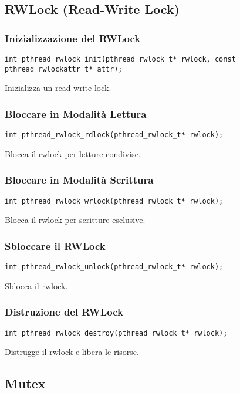 \documentclass[a4paper,12pt]{article}
\begin{document}
\subsection{RWLock (Read-Write Lock)}

\subsubsection{Inizializzazione del RWLock}
\begin{lstlisting}
int pthread_rwlock_init(pthread_rwlock_t* rwlock, const pthread_rwlockattr_t* attr);
\end{lstlisting}
Inizializza un read-write lock.

\subsubsection{Bloccare in Modalità Lettura}
\begin{verbatim}
int pthread_rwlock_rdlock(pthread_rwlock_t* rwlock);
\end{verbatim}
Blocca il rwlock per letture condivise.

\subsubsection{Bloccare in Modalità Scrittura}
\begin{verbatim}
int pthread_rwlock_wrlock(pthread_rwlock_t* rwlock);
\end{verbatim}
Blocca il rwlock per scritture esclusive.

\subsubsection{Sbloccare il RWLock}
\begin{verbatim}
int pthread_rwlock_unlock(pthread_rwlock_t* rwlock);
\end{verbatim}
Sblocca il rwlock.

\subsubsection{Distruzione del RWLock}
\begin{verbatim}
int pthread_rwlock_destroy(pthread_rwlock_t* rwlock);
\end{verbatim}
Distrugge il rwlock e libera le risorse.

\subsection{Mutex}
\end{document}

